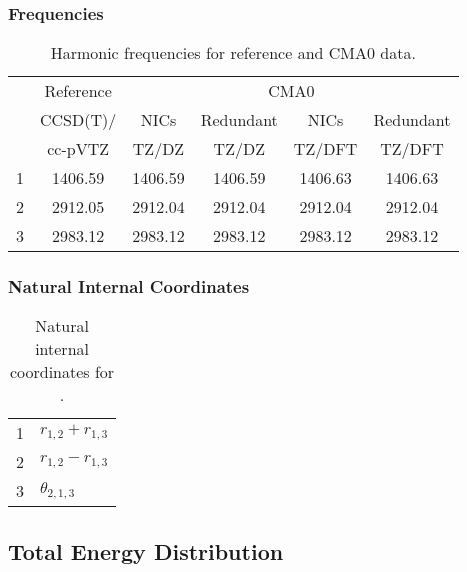 \documentclass[10pt,oneside]{article}
\begin{document}
\begin{table}[h!]
\subsubsection*{Frequencies}
\centering
\caption{Harmonic frequencies for reference and CMA0 data.}
\begin{tabular}{cccccc}
\toprule
{} & Reference & \multicolumn{4}{c}{CMA0} \\
{} &  CCSD(T)/ &    NICs &  Redundant &    NICs & Redundant \\
{} &   cc-pVTZ &   TZ/DZ &      TZ/DZ &  TZ/DFT &    TZ/DFT \\
\midrule
1 &   1406.59 & 1406.59 &    1406.59 & 1406.63 &   1406.63 \\
2 &   2912.05 & 2912.04 &    2912.04 & 2912.04 &   2912.04 \\
3 &   2983.12 & 2983.12 &    2983.12 & 2983.12 &   2983.12 \\
\bottomrule
\end{tabular}
\end{table}

\begin{table}[h!]
\subsubsection*{Natural Internal Coordinates}
\centering
\caption{Natural internal coordinates for .}
\small
\begin{tabular}{ll}
\toprule
  1   & $r_{1,2} + r_{1,3}$ \\
  2   & $r_{1,2} - r_{1,3}$ \\
  3   & $\theta_{2,1,3}$ \\
\bottomrule
\end{tabular}
\end{table}

\begin{table}
\subsection*{Total Energy Distribution}
\centering\end{table}

\clearpage

\subsection{}
\end{document}
